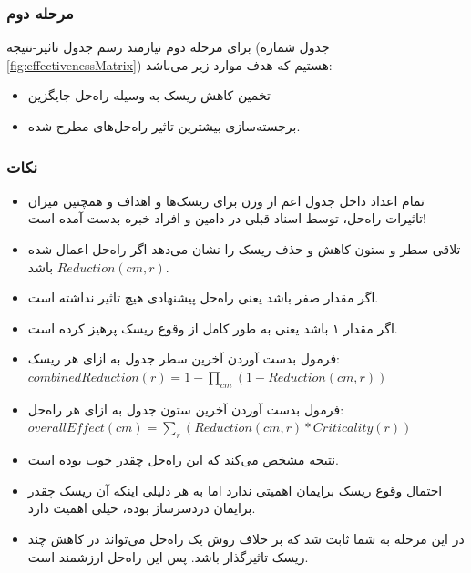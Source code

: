 \subsubsection{مرحله دوم }

برای مرحله دوم نیازمند رسم جدول تاثیر-نتیجه (جدول شماره
\ref{fig:effectivenessMatrix}) هستیم که هدف موارد زیر می‌باشد:

\begin{itemize}
    \item تخمین کاهش ریسک به وسیله راه‌حل جایگزین
    \item برجسته‌سازی بیشترین تاثیر راه‌حل‌های مطرح شده.
\end{itemize}

\subsubsection*{نکات}

\begin{itemize}
    \item تمام اعداد داخل جدول اعم از وزن‌ برای ریسک‌ها و اهداف و همچنین میزان
    تاثیرات راه‌حل، توسط اسناد قبلی در دامین و افراد خبره بدست آمده است!
\end{itemize}

\begin{itemize}
    \item تلاقی سطر و ستون کاهش و حذف ریسک را نشان می‌دهد اگر راه‌حل اعمال شده
    باشد $Reduction(cm, r)$.
    \item اگر مقدار صفر باشد یعنی راه‌حل پیشنهادی هیچ تاثیر نداشته است.
    \item اگر مقدار ۱ باشد یعنی به طور کامل از وقوع ریسک پرهیز کرده است.
    \item فرمول بدست آوردن آخرین سطر جدول به ازای هر ریسک: $combinedReduction(r) = 1 - \prod_{cm}(1 - Reduction(cm, r))$
    \item فرمول بدست آوردن آخرین ستون جدول به ازای هر راه‌حل: $overallEffect(cm) = \sum_{r}(Reduction(cm, r) * Criticality(r))$
    \item نتیجه  مشخص می‌کند که این راه‌حل
    چقدر خوب بوده است.
    \item احتمال وقوع ریسک برایمان اهمیتی ندارد اما به هر دلیلی اینکه آن ریسک
    چقدر برایمان دردسرساز بوده، خیلی اهمیت دارد.
    \item در این مرحله به شما ثابت شد که بر خلاف روش  یک راه‌حل می‌تواند
    در کاهش چند ریسک تاثیرگذار باشد. پس این راه‌حل ارزشمند است.
\end{itemize}

